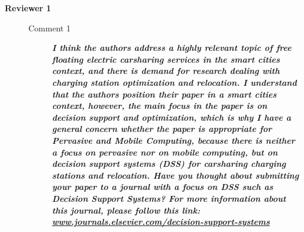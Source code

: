 \documentclass[letterpaper, 10pt]{elsarticle}
\newcommand{\rev}[1]{\textbf{\textit{#1}}}
\begin{document}
\begin{description}



\vspace{1cm}

 \item[\textbf{Reviewer 1}] \hfill
\begin{description}
 \item[Comment 1] \rev{I think the authors address a highly relevant topic of free floating electric carsharing services in the smart cities context, and there is demand for research dealing with charging station optimization and relocation. I understand that the authors position their paper in a smart cities context, however, the main focus in the paper is on decision support and optimization, which is why I have a general concern whether the paper is appropriate for Pervasive and Mobile Computing, because there is neither a focus on pervasive nor on mobile computing, but on decision support systems (DSS) for carsharing charging stations and relocation. Have you thought about submitting your paper to a journal with a focus on DSS such as Decision Support Systems? For more information about this journal, please follow this link:
\url{www.journals.elsevier.com/decision-support-systems}}


\end{description}
\end{description}
\end{document}
